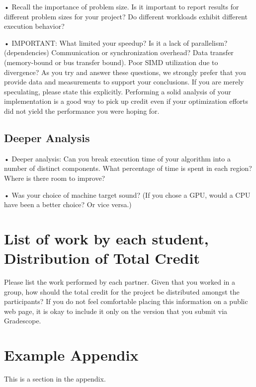 \documentclass[11pt]{article}
\begin{document}
• Recall the importance of problem size. Is it important to report results for different problem sizes for your project? Do different workloads exhibit different execution behavior?

• IMPORTANT: What limited your speedup? Is it a lack of parallelism? (dependencies) Communication or synchronization overhead? Data transfer (memory-bound or bus transfer bound). Poor SIMD utilization due to divergence? As you try and answer these questions, we strongly prefer that you provide data and measurements to support your conclusions. If you are merely speculating, please state this explicitly. Performing a solid analysis of your implementation is a good way to pick up credit even if your optimization efforts did not yield the performance you were hoping for.

\subsection{Deeper Analysis}
• Deeper analysis: Can you break execution time of your algorithm into a number of distinct components. What percentage of time is spent in each region? Where is there room to improve?

• Was your choice of machine target sound? (If you chose a GPU, would a CPU have been a better choice? Or vice versa.)

\section{List of work by each student, Distribution of Total Credit}
Please list the work performed by each partner. Given that you worked in a
group, how should the total credit for the project be distributed amongst the participants? If you do not feel comfortable placing this information on a public web page, it is okay to include it only on the version that you submit via Gradescope.





\appendix

\section{Example Appendix}
\label{sec:appendix}

This is a section in the appendix.
\end{document}
